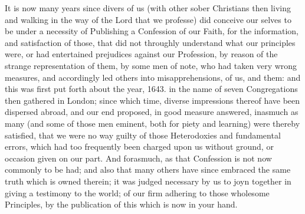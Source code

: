 \documentclass[12pt,a4paper]{book}
\begin{document}
It is now many years since divers of us (with other sober Christians then living and walking in the way of the Lord that we professe) did conceive our selves to be under a necessity of Publishing a Confession of our Faith, for the information, and satisfaction of those, that did not throughly understand what our principles were, or had entertained prejudices against our Profession, by reason of the strange representation of them, by some men of note, who had taken very wrong measures, and accordingly led others into misapprehensions, of us, and them: and this was first put forth about the year, 1643. in the name of seven Congregations then gathered in London; since which time, diverse impressions thereof have been dispersed abroad, and our end proposed, in good measure answered, inasmuch as many (and some of those men eminent, both for piety and learning) were thereby satisfied, that we were no way guilty of those Heterodoxies and fundamental errors, which had too frequently been charged upon us without ground, or occasion given on our part. And forasmuch, as that Confession is not now commonly to be had; and also that many others have since embraced the same truth which is owned therein; it was judged necessary by us to joyn together in giving a testimony to the world; of our firm adhering to those wholesome Principles, by the publication of this which is now in your hand.
\end{document}

